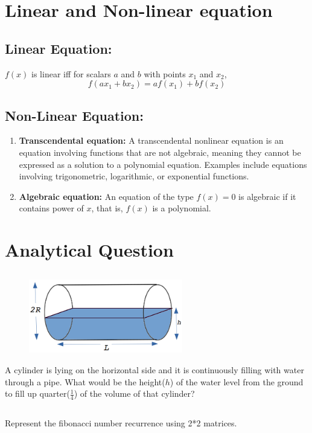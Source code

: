 \documentclass{article}
\begin{document}
\section{Linear and Non-linear equation}
\subsection{Linear Equation:}
$f(x)$ is linear iff for scalars $a$ and $b$ with points $x_1$ and $x_2$,
$$f(ax_1 + bx_2) = af(x_1) + bf(x_2)$$
\subsection{Non-Linear Equation:} 
\begin{enumerate}
\item  \textbf{Transcendental equation:} A transcendental nonlinear equation is an equation involving functions that are not algebraic, meaning they cannot be expressed as a solution to a polynomial equation. Examples include equations involving trigonometric, logarithmic, or exponential functions. 

\item \textbf{Algebraic equation:} An equation of the type $f(x) = 0$ is algebraic if it contains power of $x$, that is, $f(x)$ is a polynomial.


\end{enumerate}
\newpage 
\section{Analytical Question}

\subsection{}
\begin{figure}[htbp]
  \centering
  \includegraphics[width=0.6\textwidth]{cylinder.png} %
  
  \label{fig:my_label}
\end{figure}
A cylinder is lying on the horizontal side and it is continuously filling with water through a pipe. What would be the height($h$) of the water level from the ground to fill up quarter($\frac{1}{4}$) of the volume of that cylinder?

\subsection{}
Represent the fibonacci number recurrence using 2*2 matrices.
\end{document}
